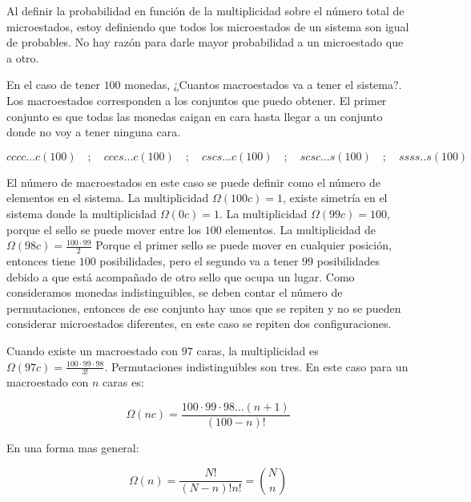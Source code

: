 \documentclass[11pt,fleqn]{book}
\begin{document}
\begin{definition}

Al definir la probabilidad en función de la multiplicidad sobre el número total de microestados, estoy definiendo que todos los microestados de un sistema son igual de probables. No hay razón para darle mayor probabilidad a un microestado que a otro.
\end{definition}

En el caso de tener $100$ monedas, ¿Cuantos macroestados va a tener el sistema?. Los macroestados corresponden a los conjuntos que puedo obtener. El primer conjunto es que todas las monedas caigan en cara hasta llegar a un conjunto donde no voy a tener ninguna cara.

\begin{equation*}
    cccc...c(100)\quad;\quad cccs...c(100)\quad;\quad cscs...c(100)\quad;\quad scsc...s(100)\quad;\quad ssss..s(100)
\end{equation*}

El número de macroestados en este caso se puede definir como el número de elementos en el sistema. La multiplicidad $\Omega(100c)=1$, existe simetría en el sistema donde la multiplicidad $\Omega(0c)=1$. La multiplicidad $\Omega(99c)=100$, porque el sello se puede mover entre los $100$ elementos. La multiplicidad de $\Omega(98c)=\frac{100\cdot99}{2}$ Porque el primer sello se puede mover en cualquier posición, entonces tiene $100$ posibilidades, pero el segundo va a tener $99$ posibilidades debido a que está acompañado de otro sello que ocupa un lugar. Como consideramos monedas indistinguibles, se deben contar el número de permutaciones, entonces de ese conjunto hay unos que se repiten y no se pueden considerar microestados diferentes, en este caso se repiten dos configuraciones. 

Cuando existe un macroestado con $97$ caras, la multiplicidad es $\Omega(97c)=\frac{100\cdot99\cdot98}{3!}$. Permutaciones indistinguibles son tres. En este caso para un macroestado con $n$ caras es:

\begin{equation*}
    \Omega(nc)=\frac{100\cdot99\cdot98...(n+1)}{(100-n)!}
\end{equation*}

En una forma mas general:

\begin{equation}
    \Omega(n)=\frac{N!}{(N-n)!n!}=\binom{N}{n}
    \label{Eq. 2.2}
\end{equation}
\end{document}
